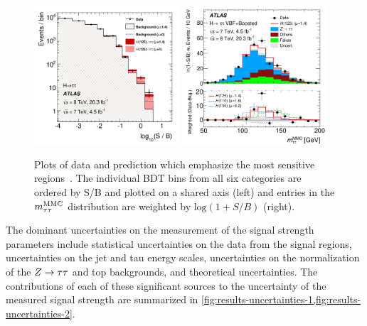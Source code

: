 \begin{figure}[tp]
  \centering
  \includegraphics[width=0.48\textwidth]{figures/HIGG-2013-32/fig_10}
  \includegraphics[width=0.48\textwidth]{figures/HIGG-2013-32/fig_11b}
  \caption{Plots of data and prediction which emphasize the most sensitive regions~\cite{HIGG-2013-32}. The individual BDT bins from all six categories are ordered by S/B and plotted on a shared axis (left) and entries in the $m_{\tau\tau}^\text{MMC}$ distribution are weighted by $\text{log}(1+S/B)$ (right).}
  \label{fig:results-money-plots}
\end{figure}

The dominant uncertainties on the measurement of the signal strength parameters include statistical uncertainties on the data from the signal regions, uncertainties on the jet and tau energy scales, uncertainties on the normalization of the $Z\rightarrow\tau\tau$ and top backgrounds, and theoretical uncertainties. The contributions of each of these significant sources to the uncertainty of the measured signal strength are summarized in \cref{fig:results-uncertainties-1,fig:results-uncertainties-2}.

